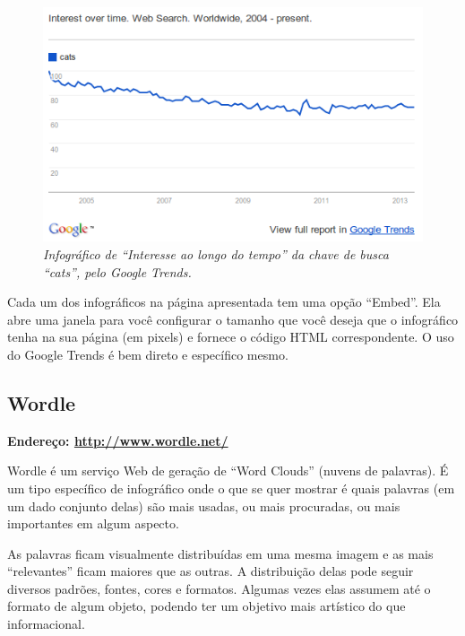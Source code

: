 \documentclass[12pt,onecolumn]{article}
\begin{document}
    \begin{figure}[ht]
      \centering
      \includegraphics[width=.9\linewidth]{cats.png}
      \caption{
        \footnotesize
        \it
        Infográfico de ``Interesse ao longo do tempo'' da chave de busca
        ``cats'', pelo Google Trends.
      }
      \label{fig:cats}
    \end{figure}
    
    Cada um dos infográficos na página apresentada tem uma opção ``Embed''. Ela
    abre uma janela para você configurar o tamanho que você deseja que o
    infográfico tenha na sua página (em pixels) e fornece o código HTML
    correspondente. O uso do Google Trends é bem direto e específico mesmo.

  \subsection{Wordle}
    \textbf{Endereço: \url{http://www.wordle.net/}}
    
    Wordle é um serviço Web de geração de ``Word Clouds'' (nuvens de palavras).
    É um tipo específico de infográfico onde o que se quer mostrar é quais
    palavras (em um dado conjunto delas) são mais usadas, ou mais procuradas,
    ou mais importantes em algum aspecto.
    
    As palavras ficam visualmente distribuídas em uma mesma imagem e as mais
    ``relevantes'' ficam maiores que as outras. A distribuição delas pode seguir
    diversos padrões, fontes, cores e formatos. Algumas vezes elas assumem até o
    formato de algum objeto, podendo ter um objetivo mais artístico do que
    informacional.
    
\end{document}

